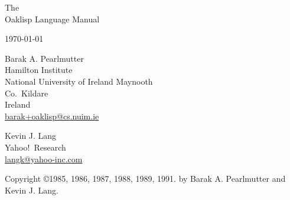 %
%
%


\begin{titlepage}

\begin{center}

\vspace*{1in}

\Huge
 The \\
 Oaklisp Language Manual \\

\vspace{.5in}

\large
 \today \\

\vspace{.25in}


\vspace{.5in}

\Large
 Barak A. Pearlmutter \\
\large
 Hamilton Institute\\
 National University of Ireland Maynooth\\
 Co.\ Kildare\\
 Ireland\\
 \url{barak+oaklisp@cs.nuim.ie}

\vspace{.5in}

\Large
 Kevin J. Lang \\
\large
 Yahoo!\ Research \\
 \url{langk@yahoo-inc.com}

\vfill


\end{center}

\end{titlepage}


\thispagestyle{empty}

\vspace*{6in}

\normalsize
\noindent Copyright \copyright 1985, 1986, 1987, 1988, 1989, 1991.
 by Barak A. Pearlmutter and Kevin J. Lang.

\newpage



